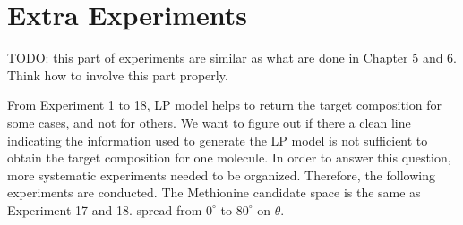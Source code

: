 \section{Extra Experiments}
TODO: this part of experiments are similar as what are done in Chapter 5 and 6. Think how to involve this part properly.

From Experiment 1 to 18, LP model helps to return the target composition for some cases, and not for others. We want to figure out if there a clean line indicating the information used to generate the LP model is not sufficient to obtain the target composition for one molecule. In order to answer this question, more systematic experiments needed to be organized. Therefore, the following experiments are conducted. The Methionine candidate space is the same as Experiment 17 and 18. spread from $0^{\circ}$ to $80^{\circ}$ on $\theta$. 





